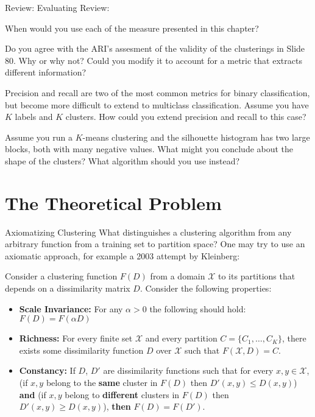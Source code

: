 \documentclass[10pt, table, dvipsnames,xcdraw,handout]{beamer}
\newcommand{\cX}{\ensuremath{\mathcal{X}}}
\begin{document}
\begin{frame}[fragile]{Review: Evaluating}
Review: 

When would you use each of the measure presented in this chapter?

Do you agree with the ARI's assesment of the validity of the clusterings in Slide 80. Why or why not? Could you modify it to account for a metric that extracts different information?

Precision and recall are two of the most common metrics for binary classification, but become more difficult to extend to multiclass classification. Assume you have $K$ labels and $K$ clusters. How could you extend  precision and recall to this case?

Assume you run a $K$-means clustering and the silhouette histogram has two large blocks, both with many negative values. What might you conclude about the shape of the clusters? What algorithm should you use instead?
\end{frame}








\section{The Theoretical Problem}

\begin{frame}[fragile]{Axiomatizing Clustering}
What distinguishes a clustering algorithm from any arbitrary function from a training set to partition space? One may try to use an axiomatic approach, for example a 2003 attempt by Kleinberg:\pause

Consider a clustering function $F(D)$ from a domain $\cX$ to its partitions that depends on a dissimilarity matrix $D$. Consider the following properties:\pause

\begin{itemize}
\item[] \textbf{Scale Invariance:} For any $\alpha>0$ the following should hold: $F(D) = F(\alpha D)$\pause
\item[] \textbf{Richness:} For every finite set $\cX$ and every partition $C = \{C_1,\ldots, C_K\}$, there exists some dissimilarity function $D$ over $\cX$ such that $F(\cX, D) = C$. \pause
\item[] \textbf{Constancy:} If $D$, $D'$ are dissimilarity functions such that for every $x,y\in \cX$, (if $x,y$ belong to the \textbf{same} cluster in $F(D)$ then $D'(x,y)\leq D(x,y)$) \textbf{and} (if $x,y$ belong to \textbf{different} clusters in $F(D)$ then $D'(x,y)\geq D(x,y)$), \textbf{then} $F(D) = F(D')$.  
\end{itemize}

\end{frame}
\end{document}
